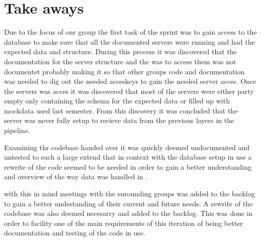 \section{Take aways}
Due to the focus of our group the first task of the sprint was to gain access to the database to make 
sure that all the documented servers were running and had the expected data and structure. During this 
process it was discovered that the documentation for the server structure and the was to access them was 
not documentet probably making it so that other groups code and documentation was needed to dig out the 
needed acceskeys to gain the needed server acces. Once the servers was acces it was discovered that most 
of the servers were either party empty only containing the schema for the expected data or filled up with 
mockdata used last semester. From this discovery it was concluded that the server was never fully setup 
to recieve data from the previous layers in the pipeline. 


Examining thr codebase handed over it was quickly deemed undocumented and untested to such a large extend 
that in context with the database setup in use a rewrite of the code seemed to be needed in order to gain 
a better understanding and overview of the way data was handled in \knox. 


with this in mind meetings with the surounding groups was added to the backlog to gain a better 
undestanding of their current and future needs. A rewrite of the codebase was also deemed necesarry and 
added to the backlog. This was done in order to facility one of the main requirements of this iteration 
of \knox being better documentation and testing of the code in use. 






